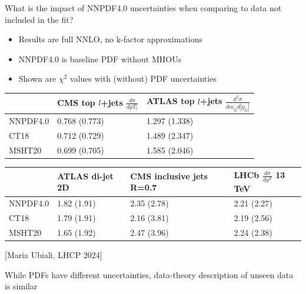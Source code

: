 \documentclass[aspectratio=43, 8pt,t]{beamer}
\begin{document}
\begin{frame}{What is the impact of NNPDF4.0 uncertainties when comparing to data not included in the fit?}
  \begin{itemize}
    \item Results are full NNLO, no k-factor approximations
    \item NNPDF4.0 is baseline PDF without MHOUs
    \item Shown are $\chi^2$ values with (without) PDF uncertainties
  \end{itemize}

  \begin{table}[]
    \footnotesize
    \begin{tabular}{@{}lll@{}}
    \toprule
             & CMS top $l$+jets $\frac{d\sigma}{dpT_t}$ & ATLAS top $l$+jets $\frac{d^2\sigma}{dm_{t\bar{t}}d|y_{t\bar{t}}|}$ \\ \midrule
    NNPDF4.0 & 0.768 (0.773)                            & 1.297 (1.338)                                                       \\
    CT18     & 0.712 (0.729)                            & 1.489 (2.347)                                                       \\
    MSHT20   & 0.699 (0.705)                            & 1.585 (2.046)                                                       \\ \bottomrule
    \end{tabular}
  \end{table}

  \begin{table}[]
    \footnotesize
    \begin{tabular}{@{}llll@{}}
    \toprule
            & ATLAS di-jet 2D & CMS inclusive jets R=0.7 & LHCb $\frac{d\sigma}{dy^Z}$ 13 TeV \\ \midrule
    NNPDF4.0 & 1.82 (1.91)     & 2.35 (2.78)              & 2.21 (2.27)                        \\
    CT18     & 1.79 (1.91)     & 2.16 (3.81)              & 2.19 (2.56)                        \\
    MSHT20   & 1.65 (1.92)     & 2.47 (3.96)              & 2.24 (2.38)                        \\ \bottomrule
    \end{tabular}
  \end{table}


  \begin{center}
    {\color{gray}\footnotesize [Maria Ubiali, LHCP 2024]}
  \end{center}

  \vfill
  \begin{center}
    While PDFs have different uncertainties, data-theory description of unseen data is similar
  \end{center}

\end{frame}
\end{document}
